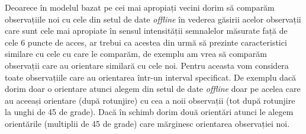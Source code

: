 \documentclass[]{article}
\newenvironment{Shaded}{\begin{snugshade}}{\end{snugshade}}
\newcommand{\KeywordTok}[1]{\textcolor[rgb]{0.13,0.29,0.53}{\textbf{#1}}}
\newcommand{\DataTypeTok}[1]{\textcolor[rgb]{0.13,0.29,0.53}{#1}}
\newcommand{\DecValTok}[1]{\textcolor[rgb]{0.00,0.00,0.81}{#1}}
\newcommand{\StringTok}[1]{\textcolor[rgb]{0.31,0.60,0.02}{#1}}
\newcommand{\CommentTok}[1]{\textcolor[rgb]{0.56,0.35,0.01}{\textit{#1}}}
\newcommand{\ControlFlowTok}[1]{\textcolor[rgb]{0.13,0.29,0.53}{\textbf{#1}}}
\newcommand{\OperatorTok}[1]{\textcolor[rgb]{0.81,0.36,0.00}{\textbf{#1}}}
\newcommand{\NormalTok}[1]{#1}
\begin{document}
\begin{Shaded}
\end{Shaded}

Deoarece în modelul bazat pe cei mai apropiați vecini dorim să comparăm
observațiile noi cu cele din setul de date \emph{offline} în vederea
găsirii acelor observații care sunt cele mai apropiate în sensul
intensității semnalelor măsurate față de cele 6 puncte de acces, ar
trebui ca acestea din urmă să prezinte caracteristici similare cu cele
cu care le comparăm, de exemplu am vrea să comparăm observații care au
orientare similară cu cele noi. Pentru aceasta vom considera toate
observațiile care au orientarea într-un interval specificat. De exemplu
dacă dorim doar o orientare atunci alegem din setul de date
\emph{offline} doar pe acelea care au aceeași orientare (după rotunjire)
cu cea a noii observații (tot după rotunjire la unghi de 45 de grade).
Dacă în schimb dorim două orientări atunci le alegem orientările
(multiplii de 45 de grade) care mărginesc orientarea observației noi.
\end{document}
